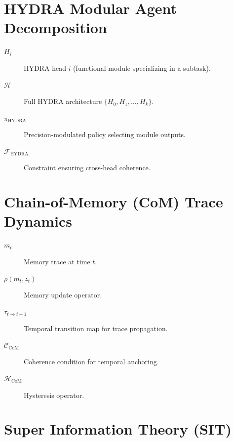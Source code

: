 \documentclass[12pt,oneside]{book}
\theoremstyle{plain}
\theoremstyle{definition}
\begin{document}
\section{HYDRA Modular Agent Decomposition}

\begin{description}

  \item[$H_i$] HYDRA head $i$ (functional module specializing in a subtask).

  \item[$\mathcal{H}$] Full HYDRA architecture $\{H_0, H_1, \dots, H_k\}$.

  \item[$\pi_{\mathrm{HYDRA}}$] Precision-modulated policy selecting module outputs.

  \item[$\mathcal{F}_{\mathrm{HYDRA}}$] Constraint ensuring cross-head coherence.

\end{description}

\section{Chain-of-Memory (CoM) Trace Dynamics}

\begin{description}

  \item[$m_t$] Memory trace at time $t$.

  \item[$\rho(m_t, z_t)$] Memory update operator.

  \item[$\tau_{t\to t+1}$] Temporal transition map for trace propagation.

  \item[$\mathcal{C}_{\mathrm{CoM}}$] Coherence condition for temporal anchoring.

  \item[$\mathcal{H}_{\mathrm{CoM}}$] Hysteresis operator.

\end{description}

\section{Super Information Theory (SIT)}
\end{document}
